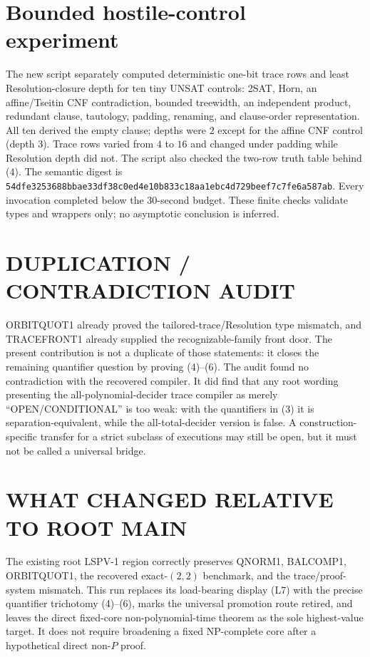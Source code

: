 \documentclass[11pt]{article}
\begin{document}
\section{Bounded hostile-control experiment}
The new script
 separately
computed deterministic one-bit trace rows and least Resolution-closure depth
for ten tiny UNSAT controls: 2SAT, Horn, an affine/Tseitin CNF contradiction,
bounded treewidth, an independent product, redundant clause, tautology,
padding, renaming, and clause-order representation.  All ten derived the
empty clause; depths were $2$ except for the affine CNF control (depth $3$).
Trace rows varied from $4$ to $16$ and changed under padding while Resolution
depth did not.  The script also checked the two-row truth table behind (4).
The semantic digest is
\texttt{54dfe3253688bbae33df38c0ed4e10b833c18aa1ebc4d729beef7c7fe6a587ab}.
Every invocation completed below the 30-second budget.  These finite checks
validate types and wrappers only; no asymptotic conclusion is inferred.

\section{DUPLICATION / CONTRADICTION AUDIT}
ORBITQUOT1 already proved the tailored-trace/Resolution type mismatch, and
TRACEFRONT1 already supplied the recognizable-family front door.  The present
contribution is not a duplicate of those statements: it closes the remaining
quantifier question by proving (4)--(6).  The audit found no contradiction
with the recovered compiler.  It did find that any root wording presenting
the all-polynomial-decider trace compiler as merely ``OPEN/CONDITIONAL'' is
too weak: with the quantifiers in (3) it is separation-equivalent, while the
all-total-decider version is false.  A construction-specific transfer for a
strict subclass of executions may still be open, but it must not be called a
universal bridge.

\section{WHAT CHANGED RELATIVE TO ROOT MAIN}
The existing root LSPV-1 region correctly preserves QNORM1, BALCOMP1,
ORBITQUOT1, the recovered exact-$(2,2)$ benchmark, and the trace/proof-system
mismatch.  This run replaces its load-bearing display (L7) with the precise
quantifier trichotomy (4)--(6), marks the universal promotion route retired,
and leaves the direct fixed-core non-polynomial-time theorem as the sole
highest-value target.  It does not require broadening a fixed NP-complete
core after a hypothetical direct non-$P$ proof.
\end{document}
